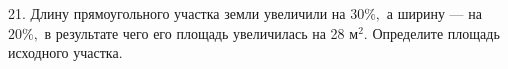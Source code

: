 21. Длину прямоугольного участка земли увеличили на $30\%,$ а ширину --- на $20\%,$ в результате чего его площадь увеличилась на 28 $\text{м}^2.$ Определите площадь исходного участка.\\
